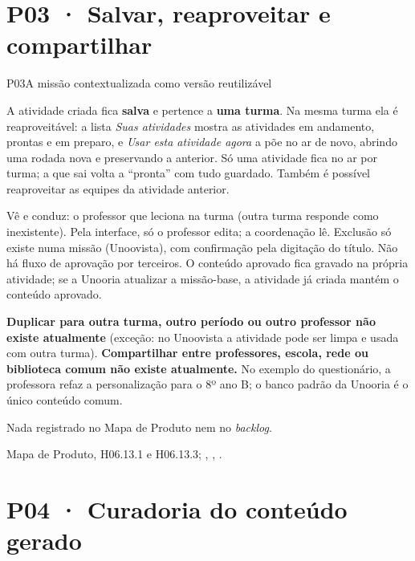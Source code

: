 \section{P03 · Salvar, reaproveitar e compartilhar}
\label{sec:p03}

\begin{resposta}{P03}{A missão contextualizada como versão reutilizável}{\parcial}
\begin{campos}
  \item[Hoje] A atividade criada fica \textbf{salva} e pertence a
    \textbf{uma turma}. Na mesma turma ela é reaproveitável: a lista
    \emph{Suas atividades} mostra as atividades em andamento, prontas e em
    preparo, e \emph{Usar esta atividade agora} a põe no ar de novo, abrindo
    uma rodada nova e preservando a anterior. Só uma atividade fica no ar por
    turma; a que sai volta a ``pronta'' com tudo guardado. Também é possível
    reaproveitar as equipes da atividade anterior.
  \item[Quem faz o quê] Vê e conduz: o professor que leciona na turma (outra
    turma responde como inexistente). Pela interface, só o professor edita;
    a coordenação lê. Exclusão só existe numa missão (Unoovista), com
    confirmação pela digitação do título. Não há fluxo de aprovação por
    terceiros. O conteúdo aprovado fica gravado na própria atividade; se a
    Unooria atualizar a missão-base, a atividade já criada mantém o conteúdo
    aprovado.
  \item[Limitações] \textbf{Duplicar para outra turma, outro período ou outro
    professor não existe atualmente} (exceção: no Unoovista a atividade pode
    ser limpa e usada com outra turma). \textbf{Compartilhar entre
    professores, escola, rede ou biblioteca comum não existe atualmente.} No
    exemplo do questionário, a professora refaz a personalização para o
    8º ano B; o banco padrão da Unooria é o único conteúdo comum.
  \item[Planejado] Nada registrado no Mapa de Produto nem no \emph{backlog}.
  \item[Evidência] Mapa de Produto, H06.13.1 e H06.13.3; ,
    , .
\end{campos}
\end{resposta}

\section{P04 · Curadoria do conteúdo gerado}
\label{sec:p04}

